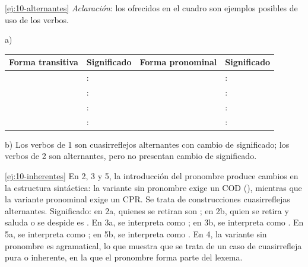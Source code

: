 \begin{solucion}{\ref{ej:10-alternantes}}
\textit{Aclaración}: los ofrecidos en el cuadro son ejemplos posibles de uso de
los verbos.

a)

{\small
\begin{tabularx}{\linewidth}{@{}l L l L@{}}
  \toprule
  Forma transitiva & Significado & Forma pronominal & Significado \\
  \midrule
   & :  &  & :  \\
   & :  &
     & :  \\
   & :  &
     & :
     \\
   & :  &  &
    :  \\
  \bottomrule
\end{tabularx}}

b) Los verbos de 1 son cuasirreflejos alternantes con cambio de significado; los
verbos de 2 son alternantes, pero no presentan cambio de significado.
\end{solucion}

\begin{solucion}{\ref{ej:10-inherentes}}
En 2, 3 y 5, la introducción del pronombre produce cambios en la estructura
sintáctica: la variante sin pronombre exige un COD (), mientras que la variante pronominal exige un CPR. Se trata
de construcciones cuasirreflejas alternantes. Significado: en 2a, quienes se
retiran son ; en 2b, quien se retira y saluda o se despide es
. En 3a,  se interpreta como ;
en 3b,  se interpreta como . En 5a,  se interpreta como ; en 5b,  se interpreta como
. En 4, la variante sin
pronombre es agramatical, lo que muestra que se trata de un caso de cuasirrefleja
pura o inherente, en la que el pronombre forma parte del lexema.
\end{solucion}

